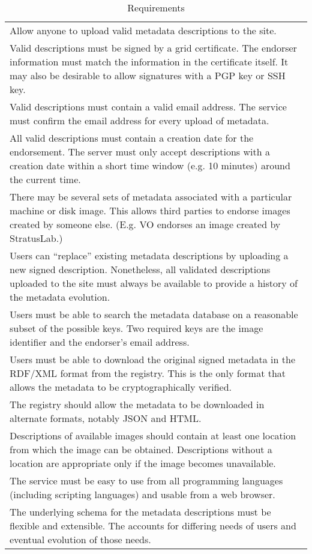 \begin{table}
\caption{Requirements}
\label{tab:requirements}
\begin{tabular}{p{}}
\hline\hline
Allow anyone to upload valid metadata descriptions to the site.

\\ Valid descriptions must be signed by a grid certificate.  The
  endorser information must match the information in the certificate
  itself.  It may also be desirable to allow signatures with a PGP key
  or SSH key.

\\ Valid descriptions must contain a valid email address.  The
  service must confirm the email address for every upload of metadata.

\\ All valid descriptions must contain a creation date for the
  endorsement.  The server must only accept descriptions with a
  creation date within a short time window (e.g. 10 minutes) around
  the current time.

\\ There may be several sets of metadata associated with a
  particular machine or disk image. This allows third parties to
  endorse images created by someone else. (E.g. VO endorses an image
  created by StratusLab.)

\\ Users can ``replace'' existing metadata descriptions by
  uploading a new signed description.  Nonetheless, all validated
  descriptions uploaded to the site must always be available to
  provide a history of the metadata evolution.

\\ Users must be able to search the metadata database on a
  reasonable subset of the possible keys.  Two required keys are the
  image identifier and the endorser's email address.

\\ Users must be able to download the original signed metadata in
  the RDF/XML format from the registry.  This is the only format that
  allows the metadata to be cryptographically verified.

\\ The registry should allow the metadata to be downloaded in
  alternate formats, notably JSON and HTML.

\\ Descriptions of available images should contain at least one
  location from which the image can be obtained.  Descriptions without
  a location are appropriate only if the image becomes unavailable.

\\ The service must be easy to use from all programming languages
  (including scripting languages) and usable from a web browser.

\\ The underlying schema for the metadata descriptions must be
  flexible and extensible.  The accounts for differing needs of users
  and eventual evolution of those needs.

\\

\hline\hline
\end{tabular}
\end{table}
